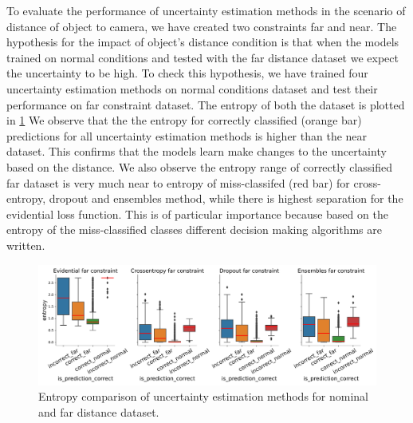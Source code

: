 To evaluate the performance of uncertainty estimation methods in the scenario of distance of object to camera, we have created two constraints far and near. The hypothesis for the impact of object's distance condition is that when the models trained on normal conditions and tested with the far distance dataset we expect the uncertainty to be high. To check this hypothesis, we have trained four uncertainty estimation methods on normal conditions dataset and test their performance on far constraint dataset. The entropy of both the dataset is plotted in \cref{fig:entropy_far}
We observe that the the entropy for correctly classified (orange bar) predictions for all uncertainty estimation methods is higher than the near dataset. This confirms that the models learn make changes to the uncertainty based on the distance. We also observe the entropy range of correctly classified far dataset is very much near to entropy of miss-classifed (red bar) for cross-entropy, dropout and ensembles method, while there is highest separation for the evidential loss function. This is of particular importance because based on the entropy of the miss-classified classes different decision making algorithms are written.

\begin{figure}[t]
	\centering
	\includegraphics[width=\textwidth]{images/entropy_far_constraint.png}
	\caption{Entropy comparison of uncertainty estimation methods for nominal and far distance dataset.}
	\label{fig:entropy_far}
\end{figure}

